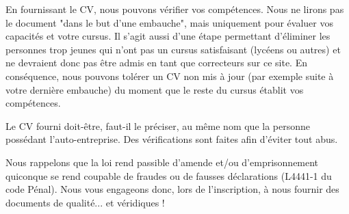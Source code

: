 ﻿En fournissant le CV, nous pouvons vérifier vos compétences.
Nous ne lirons pas le document "dans le but d'une embauche", mais uniquement pour évaluer vos capacités et votre cursus. Il s'agit aussi d'une étape permettant d'éliminer les personnes trop jeunes qui n'ont pas un cursus satisfaisant (lycéens ou autres) et ne devraient donc pas être admis en tant que correcteurs sur ce site.
En conséquence, nous pouvons tolérer un CV non mis à jour (par exemple suite à votre dernière embauche) du moment que le reste du cursus établit vos compétences.

Le CV fourni doit-être, faut-il le préciser, au même nom que la personne possédant l'auto-entreprise. Des vérifications sont faites afin d'éviter tout abus.

Nous rappelons que la loi rend passible d'amende et/ou d'emprisonnement quiconque se rend coupable de fraudes ou de fausses déclarations (L4441-1 du code Pénal). Nous vous engageons donc, lors de l'inscription, à nous fournir des documents de qualité... et véridiques !